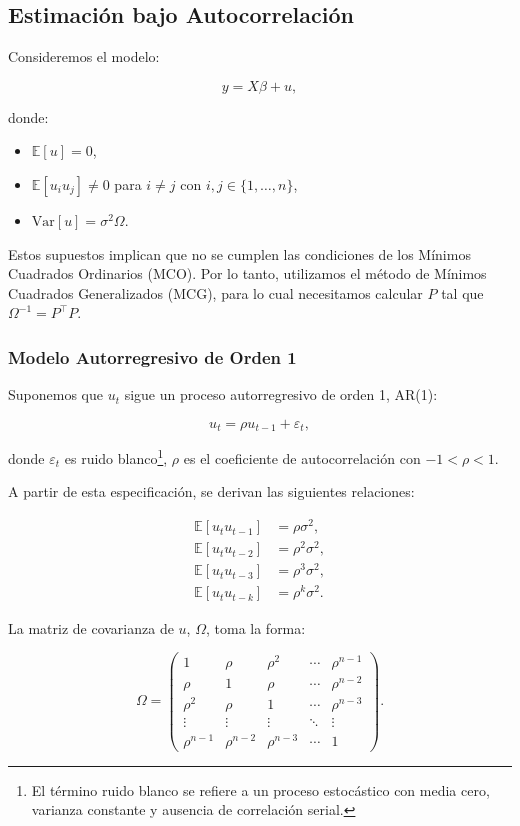 \documentclass[a4paper,12pt]{article}
\begin{document}
\subsection{Estimación bajo Autocorrelación}

Consideremos el modelo:

\[
y = X\beta + u,
\]

donde:

\begin{itemize}
    \item $\mathbb{E}[u] = 0$,
    \item $\mathbb{E}[u_i u_j] \neq 0$ para $i \neq j$ con $i, j \in \{1, \dots, n\}$,
    \item $\text{Var}[u] = \sigma^2 \Omega$.
\end{itemize}

Estos supuestos implican que no se cumplen las condiciones de los Mínimos Cuadrados Ordinarios (MCO). Por lo tanto, utilizamos el método de Mínimos Cuadrados Generalizados (MCG), para lo cual necesitamos calcular $P$ tal que $\Omega^{-1} = P^\top P$.

\subsubsection{Modelo Autorregresivo de Orden 1}

Suponemos que $u_t$ sigue un proceso autorregresivo de orden 1, AR(1):

\[
u_t = \rho u_{t-1} + \varepsilon_t,
\]

donde $\varepsilon_t$ es ruido blanco\footnote{El término ruido blanco se refiere a un proceso estocástico con media cero, varianza constante y ausencia de correlación serial.}, $\rho$ es el coeficiente de autocorrelación con $-1 < \rho < 1$.

A partir de esta especificación, se derivan las siguientes relaciones:

\[
\begin{aligned}
    \mathbb{E}[u_t u_{t-1}] &= \rho \sigma^2, \\
    \mathbb{E}[u_t u_{t-2}] &= \rho^2 \sigma^2, \\
    \mathbb{E}[u_t u_{t-3}] &= \rho^3 \sigma^2, \\
    \mathbb{E}[u_t u_{t-k}] &= \rho^k \sigma^2.
\end{aligned}
\]

La matriz de covarianza de $u$, $\Omega$, toma la forma:

\[
\Omega = 
\begin{pmatrix}
1 & \rho & \rho^2 & \cdots & \rho^{n-1} \\
\rho & 1 & \rho & \cdots & \rho^{n-2} \\
\rho^2 & \rho & 1 & \cdots & \rho^{n-3} \\
\vdots & \vdots & \vdots & \ddots & \vdots \\
\rho^{n-1} & \rho^{n-2} & \rho^{n-3} & \cdots & 1
\end{pmatrix}.
\]
\end{document}
